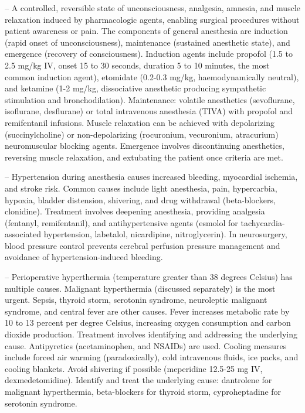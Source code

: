 -- A controlled, reversible state of unconsciousness, analgesia, amnesia, and muscle relaxation induced by pharmacologic agents, enabling surgical procedures without patient awareness or pain. The components of general anesthesia are induction (rapid onset of unconsciousness), maintenance (sustained anesthetic state), and emergence (recovery of consciousness). Induction agents include propofol (1.5 to 2.5 mg/kg IV, onset 15 to 30 seconds, duration 5 to 10 minutes, the most common induction agent), etomidate (0.2-0.3 mg/kg, haemodynamically neutral), and ketamine (1-2 mg/kg, dissociative anesthetic producing sympathetic stimulation and bronchodilation). Maintenance: volatile anesthetics (sevoflurane, isoflurane, desflurane) or total intravenous anesthesia (TIVA) with propofol and remifentanil infusions. Muscle relaxation can be achieved with depolarizing (succinylcholine) or non-depolarizing (rocuronium, vecuronium, atracurium) neuromuscular blocking agents. Emergence involves discontinuing anesthetics, reversing muscle relaxation, and extubating the patient once criteria are met.

-- Hypertension during anesthesia causes increased bleeding, myocardial ischemia, and stroke risk. Common causes include light anesthesia, pain, hypercarbia, hypoxia, bladder distension, shivering, and drug withdrawal (beta-blockers, clonidine). Treatment involves deepening anesthesia, providing analgesia (fentanyl, remifentanil), and antihypertensive agents (esmolol for tachycardia-associated hypertension, labetalol, nicardipine, nitroglycerin). In neurosurgery, blood pressure control prevents cerebral perfusion pressure management and avoidance of hypertension-induced bleeding.

-- Perioperative hyperthermia (temperature greater than 38 degrees Celsius) has multiple causes. Malignant hyperthermia (discussed separately) is the most urgent. Sepsis, thyroid storm, serotonin syndrome, neuroleptic malignant syndrome, and central fever are other causes. Fever increases metabolic rate by 10 to 13 percent per degree Celsius, increasing oxygen consumption and carbon dioxide production. Treatment involves identifying and addressing the underlying cause. Antipyretics (acetaminophen, and NSAIDs) are used. Cooling measures include forced air warming (paradoxically), cold intravenous fluids, ice packs, and cooling blankets. Avoid shivering if possible (meperidine 12.5-25 mg IV, dexmedetomidine). Identify and treat the underlying cause: dantrolene for malignant hyperthermia, beta-blockers for thyroid storm, cyproheptadine for serotonin syndrome.


